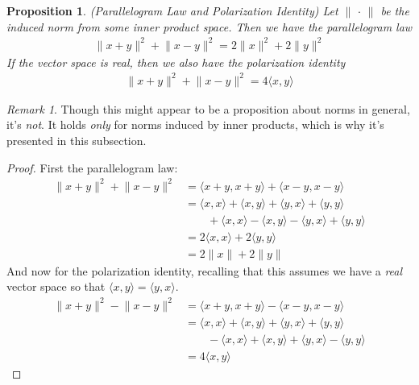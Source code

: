 \documentclass[12pt]{article}
\numberwithin{equation}{section} %
\theoremstyle{plain}
\newtheorem{prop}[thm]{Proposition}
\theoremstyle{definition}
\theoremstyle{remark}
\newtheorem*{rmk}{Remark}
\begin{document}
\begin{prop}\emph{(Parallelogram Law and Polarization Identity)}
Let $\lVert\,\cdot\,\rVert$ be the induced norm from some inner product
space.
Then we have the \emph{parallelogram law}
\begin{align*}
  \lVert x+y\rVert^2 +
  \lVert x-y\rVert^2 =
  2\lVert x \rVert^2
  + 2\lVert y \rVert^2
\end{align*}
If the vector space is \emph{real}, then we also have the
\emph{polarization identity}
\begin{align*}
  \lVert x+y\rVert^2 +
  \lVert x-y\rVert^2 = 4\langle x,y \rangle
\end{align*}
\end{prop}
\begin{rmk}
Though this might appear to be a proposition about norms in general,
it's \emph{not}. It holds \emph{only} for norms induced by inner
products, which is why it's presented in this subsection.
\end{rmk}
\begin{proof}
First the parallelogram law:
\begin{align*}
  \lVert x+y\rVert^2 +
  \lVert x-y\rVert^2
  &=
  \langle x+y, x+y\rangle
  + \langle x-y, x-y\rangle \\
  &=
  \langle x, x\rangle
  + \langle x, y\rangle
  + \langle y, x\rangle
  + \langle y, y\rangle \\
  &\qquad
  + \langle x, x\rangle
  - \langle x, y\rangle
  - \langle y, x\rangle
  + \langle y, y\rangle \\
  &=
  2\langle x, x\rangle
  + 2\langle y, y\rangle \\
  &=
  2\lVert x\rVert
  + 2\lVert y\rVert
\end{align*}
And now for the polarization identity, recalling that this assumes we
have a \emph{real} vector space so that
$\langle x,y\rangle = \langle y,x\rangle$.
\begin{align*}
  \lVert x+y\rVert^2 -
  \lVert x-y\rVert^2
  &=
  \langle x+y, x+y\rangle
  - \langle x-y, x-y\rangle \\
  &=
  \langle x, x\rangle
  + \langle x, y\rangle
  + \langle y, x\rangle
  + \langle y, y\rangle \\
  &\qquad
  - \langle x, x\rangle
  + \langle x, y\rangle
  + \langle y, x\rangle
  - \langle y, y\rangle \\
  &=
  4\langle x, y\rangle
\end{align*}
\end{proof}
\end{document}
